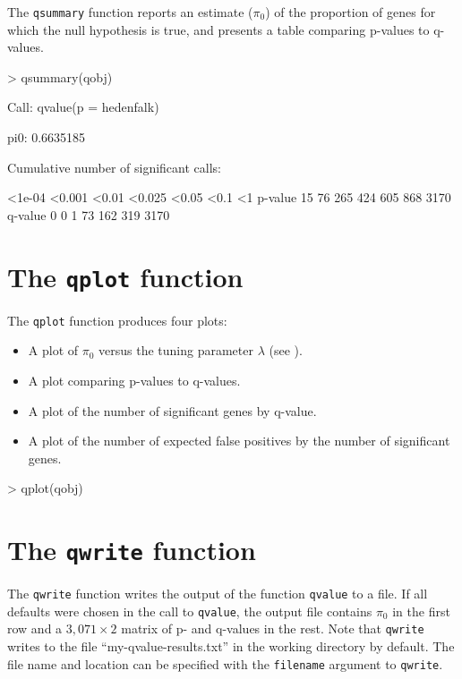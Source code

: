 \documentclass[11pt]{article}
\newcommand{\Rfunction}[1]{{\texttt{#1}}}
\newcommand{\Rfunarg}[1]{{\texttt{#1}}}
\begin{document}
The \Rfunction{qsummary} function reports an estimate ($\pi_0$) of the proportion of genes for which the null 
hypothesis is true, and presents a table comparing p-values to q-values.

\begin{Schunk}
\begin{Sinput}
> qsummary(qobj)
\end{Sinput}
\begin{Soutput}
Call:
qvalue(p = hedenfalk)

pi0:	0.6635185	

Cumulative number of significant calls:

        <1e-04 <0.001 <0.01 <0.025 <0.05 <0.1   <1
p-value     15     76   265    424   605  868 3170
q-value      0      0     1     73   162  319 3170
\end{Soutput}
\end{Schunk}

\section{The \Rfunction{qplot} function}

The \Rfunction{qplot} function produces four plots:
\begin{itemize}
\item A plot of $\pi_0$ versus the tuning parameter $\lambda$ (see \cite{storey:tibs:2003}).
\item A plot comparing p-values to q-values.
\item A plot of the number of significant genes by q-value.
\item A plot of the number of expected false positives by the number of significant genes.
\end{itemize}

\begin{Schunk}
\begin{Sinput}
> qplot(qobj)
\end{Sinput}
\end{Schunk}

\section{The \Rfunction{qwrite} function}

The \Rfunction{qwrite} function writes the output of the function \texttt{qvalue} to a file.  If all defaults 
were chosen in the call to \Rfunction{qvalue}, the output file contains $\pi_0$ in the first row and 
a $3,071 \times 2$ matrix of p- and q-values in the rest.  Note that \Rfunction{qwrite} writes to the file 
``my-qvalue-results.txt'' in the working directory by default.  The file name and location can be specified 
with the \Rfunarg{filename} argument to \Rfunction{qwrite}.
\end{document}
